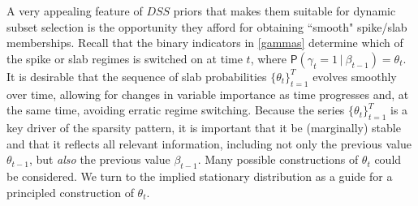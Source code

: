 \documentclass[ba]{imsart}
\numberwithin{equation}{section}
\theoremstyle{plain}
\renewcommand{\P}{\mathsf{P}}
\def\C {\,|\:}
\def\C {\,|\:}
\begin{document}
A very appealing feature of $DSS$ priors that makes them suitable for dynamic subset selection is the opportunity they afford  for obtaining ``smooth" spike/slab memberships.
Recall that  the binary indicators in \eqref{gammas} determine which of the spike or slab regimes is switched on at time $t$, where $\P(\gamma_t=1\C\beta_{t-1})=\theta_t$. 
   It is desirable that the sequence of slab probabilities $\{\theta_t\}_{t=1}^T$ evolves smoothly over time, allowing for changes  in variable importance as time progresses and, at the same time, avoiding erratic regime switching. 
Because the series $\{\theta_t\}_{t=1}^T$ is a key driver of the sparsity pattern, it is important that  it be (marginally) stable and that it reflects all relevant information, including not only the previous value $\theta_{t-1}$, but {\sl also} the previous value $\beta_{t-1}$. Many possible constructions of $\theta_t$ could be considered. We turn to the implied stationary distribution as a guide for a principled construction of  $\theta_t$.


\end{document}
